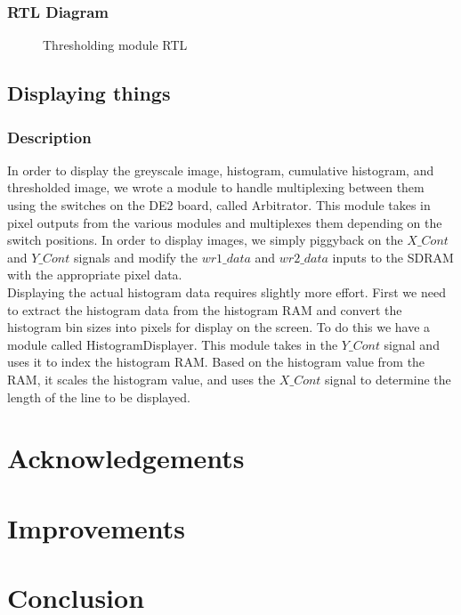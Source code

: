 \documentclass[12pt]{article}
\begin{document}
  \subsubsection{RTL Diagram}
  \begin{figure}[H]
    \caption{Thresholding module RTL}
    \label{fig:thresholder_rtl}
  \end{figure}
  
  
  \subsection{Displaying things}
  \subsubsection{Description}
  In order to display the greyscale image, histogram, cumulative histogram, and thresholded image, we wrote a module to handle multiplexing between them using the switches on the DE2 board, called Arbitrator. This module takes in pixel outputs from the various modules and multiplexes them depending on the switch positions. In order to display images, we simply piggyback on the \(X\_Cont\) and \(Y\_Cont\) signals and modify the \(wr1\_data\) and \(wr2\_data\) inputs to the SDRAM with the appropriate pixel data. \\
      
  Displaying the actual histogram data requires slightly more effort. First we need to extract the histogram data from the histogram RAM and convert the histogram bin sizes into pixels for display on the screen. To do this we have a module called HistogramDisplayer. This module takes in the \(Y\_Cont\) signal and uses it to index the histogram RAM. Based on the histogram value from the RAM, it scales the histogram value, and uses the \(X\_Cont\) signal to determine the length of the line to be displayed. 
  
  \section{Acknowledgements}
  
  \section{Improvements}
  
  \section{Conclusion}
  
  
  
  
\end{document}
